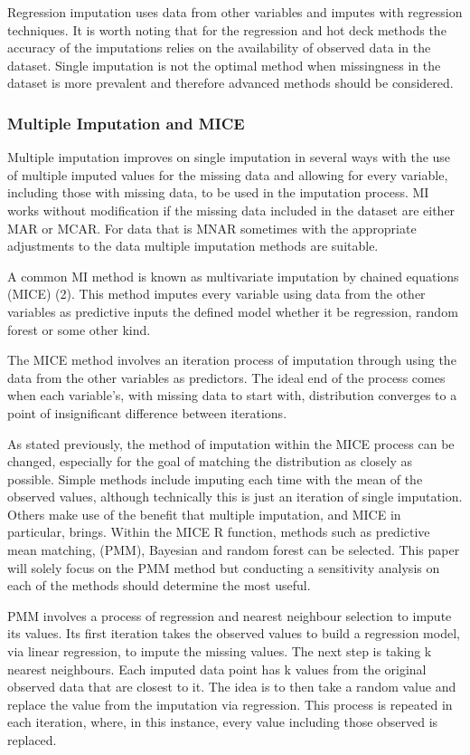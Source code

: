 \documentclass[11pt]{article}
\begin{document}
Regression imputation uses data from other variables and imputes with regression techniques. It is worth noting that for the regression and hot deck methods the accuracy of the imputations relies on the availability of observed data in the dataset. Single imputation is not the optimal method when missingness in the dataset is more prevalent and therefore advanced methods should be considered.\cite{Woods2021}
 
\subsubsection{Multiple Imputation and MICE}
Multiple imputation improves on single imputation in several ways with the use of multiple imputed values for the missing data and allowing for every variable, including those with missing data, to be used in the imputation process\cite{White2010}. MI works without modification if the missing data included in the dataset are either MAR or MCAR. For data that is MNAR sometimes with the appropriate adjustments to the data multiple imputation methods are suitable. 

A common MI method is known as multivariate imputation by chained equations (MICE) (2). This method imputes every variable using data from the other variables as predictive inputs the defined model whether it be regression, random forest or some other kind.

The MICE method involves an iteration process of imputation through using the data from the other variables as predictors. The ideal end of the process comes when each variable's, with missing data to start with, distribution converges to a point of insignificant difference between iterations\cite{Galimard2018}.

As stated previously, the method of imputation within the MICE process can be changed, especially for the goal of matching the distribution as closely as possible. Simple methods include imputing each time with the mean of the observed values, although technically this is just an iteration of single imputation. Others make use of the benefit that multiple imputation, and MICE in particular, brings. Within the MICE R function, methods such as predictive mean matching, (PMM), Bayesian and random forest can be selected. This paper will solely focus on the PMM method but conducting a sensitivity analysis on each of the methods should determine the most useful.

PMM involves a process of regression and nearest neighbour selection to impute its values. Its first iteration takes the observed values to build a regression model, via linear regression, to impute the missing values. The next step is taking k nearest neighbours. Each imputed data point has k values from the original observed data that are closest to it. The idea is to then take a random value and replace the value from the imputation via regression. This process is repeated in each iteration, where, in this instance, every value including those observed is replaced\cite{Morris2014}.
\end{document}
